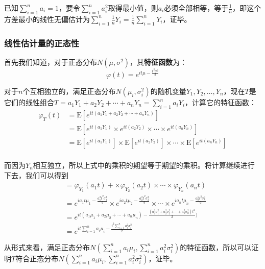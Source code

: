 \documentclass[UTF8]{ctexbook}
\begin{document}
已知$\sum_{i=1}^na_i=1$，要令$\sum_{i=1}^na_i^2$取得最小值，则$a_i$必须全部相等，等于$\frac{1}{n}$，即这个方差最小的线性无偏估计为$\sum_{i=1}^n\frac{1}{n}Y_i=\frac{1}{n}\sum_{i=1}^nY_i$，证毕。

\subsubsection{线性估计量的正态性}
\label{proof5}
首先我们知道，对于正态分布$N(\mu, \sigma^2)$，其\textbf{特征函数}为：
\[
	\varphi(t)=e^{it\mu-\frac{t^2\sigma^2}{2}}
\]

对于$n$个互相独立的，满足正态分布$N(\mu_i,\sigma_i^2)$的随机变量$Y_1,Y_2,\dots,Y_n$，现在$T$是它们的线性组合$T=a_1Y_1+a_2Y_2+\cdots+a_nY_n=\sum_{i=1}^na_iY_i$，计算它的特征函数：
\[
	\begin{aligned}
	\varphi_T(t)&=\mathrm E[e^{it(a_1Y_1+a_2Y_2+\cdots+a_nY_n)}]\\
	&=\mathrm E[e^{it(a_1Y_1)}\times e^{it(a_2Y_2)}\times \cdots \times e^{it(a_nY_n)}]\\
	&=\mathrm E[e^{it(a_1Y_1)}]\times \mathrm E[e^{it(a_2Y_2)}] \times \cdots \times \mathrm E[e^{it(a_nY_n)}]\\
	\end{aligned}
\]

而因为$Y_n$相互独立，所以上式中的乘积的期望等于期望的乘积。将计算继续进行下去，我们可以得到
\begin{align*}
	&=\varphi_{Y_1}(a_1t)+\times\varphi_{Y_2}(a_2t)\times\cdots\times\varphi_{Y_n}(a_nt)\\
	&=e^{ia_1t\mu_1-\frac{a_1^2t^2\sigma_1^2}{2}}\times e^{ia_2t\mu_2-\frac{a_2^2t^2\sigma_2^2}{2}}\times\cdots\times e^{ia_nt\mu_n-\frac{a_n^2t^2\sigma_n^2}{2}}\\
	&=e^{it(a_1\mu_1+a_2\mu_2+\cdots+a_n\mu_n)-\frac{(a_1^2\sigma_1^2+a_2^2\sigma_2^2+\cdots+a_n^2\sigma_n^2)t^2}{2})}\\
	&=e^{it\sum_{i=1}^na_i\mu_i-\frac{t^2\sum_{i=1}^na_i^2\sigma_i^2}{2}}
\end{align*}

从形式来看，满足正态分布$N(\sum_{i=1}^na_i\mu_i, \sum_{i=1}^na_i^2\sigma_i^2)$的特征函数，所以可以证明$T$符合正态分布$N(\sum_{i=1}^na_i\mu_i, \sum_{i=1}^na_i^2\sigma_i^2)$，证毕。
\end{document}
